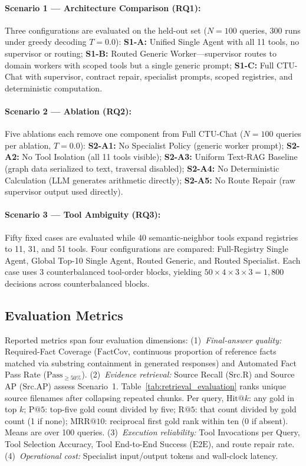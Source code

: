 \paragraph{Scenario 1 --- Architecture Comparison (RQ1):}
Three configurations are evaluated on the held-out set ($N{=}100$ queries, 300 runs under greedy decoding $T{=}0.0$):
\textbf{S1-A:} Unified Single Agent with all 11 tools, no supervisor or routing;
\textbf{S1-B:} Routed Generic Worker---supervisor routes to domain workers with scoped tools but a single generic prompt;
\textbf{S1-C:} Full CTU-Chat with supervisor, contract repair, specialist prompts, scoped registries, and deterministic computation.

\paragraph{Scenario 2 --- Ablation (RQ2):}
Five ablations each remove one component from Full CTU-Chat ($N{=}100$ queries per ablation, $T{=}0.0$):
\textbf{S2-A1:} No Specialist Policy (generic worker prompt);
\textbf{S2-A2:} No Tool Isolation (all 11 tools visible);
\textbf{S2-A3:} Uniform Text-RAG Baseline (graph data serialized to text, traversal disabled);
\textbf{S2-A4:} No Deterministic Calculation (LLM generates arithmetic directly);
\textbf{S2-A5:} No Route Repair (raw supervisor output used directly).

\paragraph{Scenario 3 --- Tool Ambiguity (RQ3):}
Fifty fixed cases are evaluated while 40 semantic-neighbor tools expand registries to 11, 31, and 51 tools. Four configurations are compared: Full-Registry Single Agent, Global Top-10 Single Agent, Routed Generic, and Routed Specialist. Each case uses 3 counterbalanced tool-order blocks, yielding $50 \times 4 \times 3 \times 3 = 1{,}800$ decisions across counterbalanced blocks.

\subsection{Evaluation Metrics}
\label{sec:metrics}

Reported metrics span four evaluation dimensions:
(1)~\emph{Final-answer quality:} Required-Fact Coverage ($\text{FactCov}$, continuous proportion of reference facts matched via substring containment in generated responses) and Automated Fact Pass Rate ($\text{Pass}_{\ge 50\%}$).
(2)~\emph{Evidence retrieval:} Source Recall ($\text{Src.R}$) and Source AP ($\text{Src.AP}$) assess Scenario~1. Table~\ref{tab:retrieval_evaluation} ranks unique source filenames after collapsing repeated chunks. Per query, $\text{Hit}@k$: any gold in top $k$; $\text{P}@5$: top-five gold count divided by five; $\text{R}@5$: that count divided by gold count (1 if none); $\text{MRR}@10$: reciprocal first gold rank within ten (0 if absent). Means are over 100 queries.
(3)~\emph{Execution reliability:} Tool Invocations per Query, Tool Selection Accuracy, Tool End-to-End Success ($\text{E2E}$), and route repair rate.
(4)~\emph{Operational cost:} Specialist input/output tokens and wall-clock latency.

